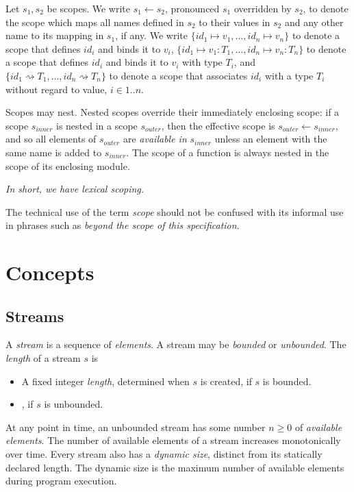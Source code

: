 \documentclass{article}
\begin{document}
Let $s_1, s_2$ be scopes.  We write $s_1 \leftarrow s_2$, pronounced $s_1$ overridden by $s_2$, to denote the scope  which maps all names defined in $s_2$ to their values in $s_2$ and any other name to its mapping in $s_1$, if any. We write $\{id_1 \mapsto v_1, \ldots, id_n \mapsto v_n\}$ to denote a scope that defines $id_i$ and binds it to $v_i$,  $\{id_1 \mapsto v_1: T_1, \ldots, id_n \mapsto  v_n: T_n\}$ to denote a scope that defines $id_i$ and binds it to $v_i$ with type $T_i$, and $\{id_1 \rightsquigarrow  T_1, \ldots, id_n \rightsquigarrow T_n\}$ to denote a scope that associates $id_i$ with a type $T_i $ without regard to value, $i \in 1..n$.

Scopes may nest. Nested scopes override their immediately enclosing scope: if a scope $s_{inner}$ is nested in a scope $s_{outer}$, then the effective scope is $s_{outer} \leftarrow s_{inner}$, and so all elements of $s_{outer}$ are {\em available in} $s_{inner}$ unless an element with the same name is added to $s_{inner}$.
The scope of a function is always nested in the scope of its enclosing module. 

{\em
In short, we have lexical scoping.
}

The technical use of the term {\em scope} should not be confused with its informal use in phrases such as {\em beyond the scope of this specification.}



\section{Concepts}
\label{concepts}

\subsection{Streams}
\label{streams}

A {\em stream} is a sequence of {\em elements}.  A stream may be {\em bounded} or {\em unbounded}. The {\em length} of a stream $s$  is 
\begin{itemize}
\item A fixed integer {\em length}, determined when $s$ is created, if $s$ is bounded.
\item \QUESTIONMARK{}, if $s$ is unbounded.
\end{itemize}

At any point in time, an unbounded stream has some number $n \ge 0$ of {\em available elements}. The number of available elements of a stream increases monotonically over time. Every stream also has a {\em dynamic size}, distinct from its statically declared length. The dynamic size is the maximum number of available elements during program execution.
\end{document}

